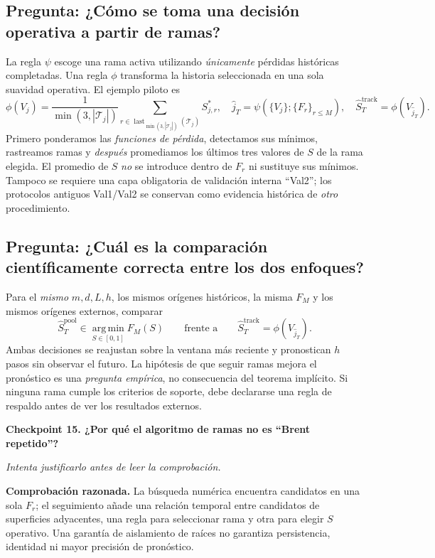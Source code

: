 \documentclass[11pt,letterpaper,parskip=half,headings=small]{scrartcl}
\theoremstyle{definition}\newtheorem{definicion}[proposicion]{Definición}
\theoremstyle{remark}\newtheorem{observacion}[proposicion]{Observación}
\newcommand{\argmin}{\operatorname*{arg\,min}}\newcommand{\diag}{\operatorname{diag}}
\newcommand{\pregunta}[1]{\subsection{Pregunta: #1}}
\newcommand{\checkpoint}[3]{%
  \par\medskip\noindent\textbf{\color{blue!45!black}Checkpoint #1. #2}\par
  \noindent\emph{Intenta justificarlo antes de leer la comprobación.}\par
  \noindent\textbf{Comprobación razonada. }#3\par\bigskip
}
\begin{document}
\pregunta{¿Cómo se toma una decisión operativa a partir de ramas?}
La regla $\psi$ escoge una rama activa utilizando \emph{únicamente}
pérdidas históricas completadas. Una regla $\phi$ transforma la historia
seleccionada en una sola suavidad operativa. El ejemplo piloto es
\[
\phi(V_j)=\frac1{\min(3,|\mathcal T_j|)}
\sum_{r\in\operatorname{last}_{\min(3,|\mathcal T_j|)}(\mathcal T_j)}
S^*_{j,r},\quad
\widehat j_T=\psi(\{V_j\};\{F_r\}_{r\le M}),\quad
\widehat S_T^{\mathrm{track}}=\phi(V_{\widehat j_T}).
\]
Primero ponderamos las \emph{funciones de pérdida}, detectamos sus
mínimos, rastreamos ramas y \emph{después} promediamos los últimos tres
valores de $S$ de la rama elegida. El promedio de $S$ \emph{no} se
introduce dentro de $F_r$ ni sustituye sus mínimos. Tampoco se
requiere una capa obligatoria de validación interna ``Val2'';
los protocolos antiguos Val1/Val2 se conservan como evidencia histórica
de \emph{otro} procedimiento.

\pregunta{¿Cuál es la comparación científicamente correcta entre los dos enfoques?}
Para el \emph{mismo} $m,d,L,h$, los mismos orígenes históricos, la misma
$F_M$ y los mismos orígenes externos, comparar
\[
\widehat S_T^{\mathrm{pool}}\in\argmin_{S\in[0,1]}F_M(S)
\qquad\text{frente a}\qquad
\widehat S_T^{\mathrm{track}}=\phi(V_{\widehat j_T}).
\]
Ambas decisiones se reajustan sobre la ventana más reciente y
pronostican $h$ pasos sin observar el futuro. La hipótesis de que
seguir ramas mejora el pronóstico es una \emph{pregunta empírica},
no consecuencia del teorema implícito. Si ninguna rama cumple los
criterios de soporte, debe declararse una regla de respaldo antes
de ver los resultados externos.

\checkpoint{15}{¿Por qué el algoritmo de ramas no es ``Brent repetido''?}{La búsqueda numérica encuentra candidatos en una sola $F_r$; el seguimiento añade una relación temporal entre candidatos de superficies adyacentes, una regla para seleccionar rama y otra para elegir $S$ operativo. Una garantía de aislamiento de raíces no garantiza persistencia, identidad ni mayor precisión de pronóstico.}
\end{document}
